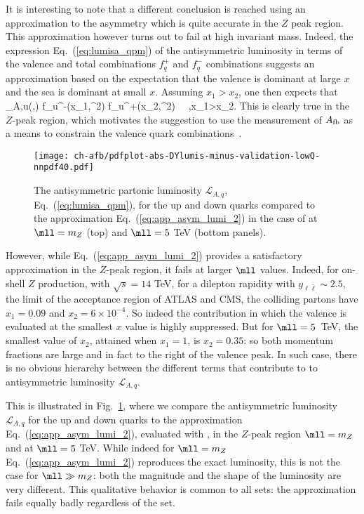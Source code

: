 It is interesting to note that a different conclusion is reached using
an approximation to the asymmetry which is quite accurate  in the $Z$
peak region.
%
This approximation however turns out to fail at high
invariant mass.
%
Indeed, the expression Eq.~(\ref{eq:lumisa_qpm}) of the antisymmetric
luminosity in terms of the valence 
and total \pdf combinations $f_q^+$ and $f_q^-$ \pdf combinations
suggests an approximation based on the expectation
that the valence is dominant at large $x$ and the sea is dominant at
small $x$. Assuming $x_1> x_2$, one then expects that
\be
{}_{A,u}(\yll,\mll) \approx{} f_u^-(x_1,\mll^2)
f_{u}^+(x_2,\mll^2)   \,  \, ,\quad x_1>x_2.
\label{eq:app_asym_lumi_2}
\ee
This is clearly true  in the $Z$-peak region, which  motivates the
suggestion to use the measurement of $A_{\rm fb}$ as a means to
 constrain the valence quark combinations~\cite{Accomando:2019vqt}.

\begin{figure}[!t]
 \centering
 \texttt{[image: ch-afb/pdfplot-abs-DYlumis-minus-validation-lowQ-nnpdf40.pdf]}
 \caption{The  antisymmetric partonic luminosity $\mathcal{L}_{A,q}$, Eq.~(\ref{eq:lumisa_qpm}),
for the up and down quarks 
compared to the approximation 
Eq.~(\ref{eq:app_asym_lumi_2}) in the case of 
at $\mll=m_Z$ (top)
and $\mll=5$ TeV (bottom panels).
 }    
 \label{fig:pdfplot-abs-DYlumis-minus-validation-lowQ-nnpdf40}
\end{figure}

However, while Eq.~(\ref{eq:app_asym_lumi_2}) provides
a satisfactory approximation in the  $Z$-peak region,
it fails  at larger $\mll$ values. Indeed, for on-shell $Z$
production, with $\sqrt{s}=14$ TeV,
for a dilepton rapidity with $y_{\ell\bar{\ell}}\sim 2.5$, the limit of the
acceptance region
of ATLAS and CMS, the colliding partons have
$x_1=0.09$ and $x_2=6\times 10^{-4}$. So indeed the contribution in
which the valence \pdf is evaluated at the smallest $x$ value is highly suppressed.
%
But for $\mll=5$~TeV, the smallest value of $x_2$, attained when
$x_1=1$, is $x_2=0.35$: so both momentum fractions are large and in fact
to the right of the valence peak.
%
In such case, there 
is no obvious hierarchy between
the different terms that contribute to to antisymmetric
luminosity $\mathcal{L}_{A,q}$.

This is illustrated in
Fig.~\ref{fig:pdfplot-abs-DYlumis-minus-validation-lowQ-nnpdf40},
where we compare the antisymmetric luminosity $\mathcal{L}_{A,q}$
for the up and down quarks 
to the approximation
Eq.~(\ref{eq:app_asym_lumi_2}), evaluated with  \nnlo,
in the $Z$-peak region $\mll=m_Z$ 
and at $\mll=5$ TeV.
%
While indeed for $\mll=m_Z$ Eq.~(\ref{eq:app_asym_lumi_2}) reproduces
the exact luminosity, this is not the case for $\mll\gg m_Z$: both
the magnitude and the shape of the luminosity are  very different.
%
This qualitative behavior is common to all \pdf sets: the approximation
fails equally badly regardless of the \pdf set.

